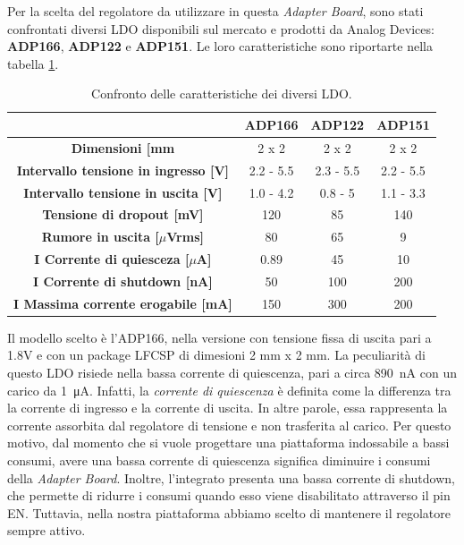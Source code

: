 Per la scelta del regolatore da utilizzare in questa \textit{Adapter Board}, sono stati confrontati diversi LDO disponibili sul mercato e prodotti da Analog Devices: \textbf{ADP166}\cite{AnalogDevicesADP166}, \textbf{ADP122}\cite{AnalogDevicesADP122} e \textbf{ADP151}\cite{AnalogDevicesADP151}. Le loro caratteristiche sono riportarte nella tabella \ref{tab:ConfrontoLDO}.
\begin{table}[h]
	\renewcommand{\arraystretch}{1.5}
	\centering
	\begin{tabular}{cccc}
		\hline
		& \textbf{ADP166} & \textbf{ADP122} & \textbf{ADP151} \\ \hline
		\textbf{Dimensioni {[}mm\ap{2}{]}}                   & 2 x 2           & 2 x 2           & 2 x 2           \\ \hline
		\textbf{Intervallo tensione in ingresso {[}V{]}}  & 2.2 - 5.5       & 2.3 - 5.5       & 2.2 - 5.5       \\ \hline
		\textbf{Intervallo tensione in uscita {[}V{]}}    & 1.0 - 4.2       & 0.8 - 5         & 1.1 - 3.3       \\ \hline
		\textbf{Tensione di dropout {[}mV{]}}            & 120             & 85              & 140             \\ \hline
		\textbf{Rumore in uscita {[}$\mu$Vrms{]}}         & 80              & 65              & 9               \\ \hline
		\textbf{I\ped{q} Corrente di quiesceza {[}$\mu$A{]}}    & 0.89            & 45              & 10              \\ \hline
		\textbf{I\ped{s} Corrente di shutdown {[}nA{]}}      & 50              & 100             & 200             \\ \hline
		\textbf{I\ped{MAX} Massima corrente erogabile {[}mA{]}} & 150             & 300             & 200             \\ \hline
	\end{tabular}
	\caption{Confronto delle caratteristiche dei diversi LDO.}
	\label{tab:ConfrontoLDO}
\end{table}

\noindent Il modello scelto è l'ADP166, nella versione con tensione fissa di uscita pari a 1.8V e con un package LFCSP di dimesioni 2 mm x 2 mm. La peculiarità di questo LDO risiede nella bassa corrente di quiescenza, pari a circa \SI{890}{\nano\ampere} con un carico da \SI{1}{\micro\ampere}\cite{AnalogDevicesADP166}. Infatti, la \textit{corrente di quiescenza} è definita come la differenza tra la corrente di ingresso e la corrente di uscita\cite{Lee1999}. In altre parole, essa rappresenta la corrente assorbita dal regolatore di tensione e non trasferita al carico. Per questo motivo, dal momento che si vuole progettare una piattaforma indossabile a bassi consumi, avere una bassa corrente di quiescenza significa diminuire i consumi della \textit{Adapter Board}. Inoltre, l'integrato presenta una bassa corrente di shutdown, che permette di ridurre i consumi quando esso viene disabilitato attraverso il pin EN. Tuttavia, nella nostra piattaforma abbiamo scelto di mantenere il regolatore sempre attivo.

